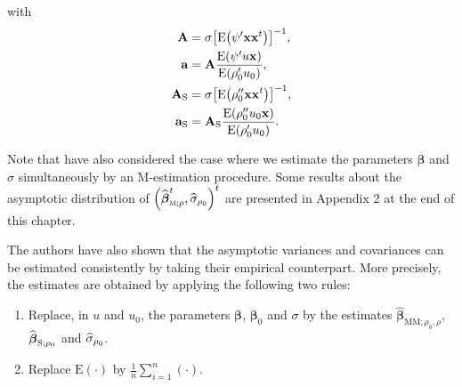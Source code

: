 with
\begin{align}
\mathbf{A}  &  =\sigma\left[  \mathrm{E}\left(  \psi^{\prime}\mathbf{xx}%
^{t}\right)  \right]  ^{-1},\label{eq:A}\\
\mathbf{a}  &  =\mathbf{A}\frac{\mathrm{E}\left(  \psi^{\prime}u\stvec{x}%
\right)  }{\mathrm{E}\left(  \rho_{0}^{\prime}u_{0}\right)  },\label{eq:a}\\
\mathbf{A}_{\mathrm{S}}  &  =\sigma\left[  \mathrm{E}\left(  \rho_{0}%
^{\prime\prime}\mathbf{xx}^{t}\right)  \right]  ^{-1},\label{eq:A_S}\\
\mathbf{a}_{\mathrm{S}}  &  =\mathbf{A}_{\mathrm{S}}\frac{\mathrm{E}\left(
\rho_{0}^{\prime\prime}u_{0}\stvec{x}\right)  }{\mathrm{E}\left(  \rho
_{0}^{\prime}u_{0}\right)  }. \label{eq:a_S}%
\end{align}


\begin{stremark}
\bigskip Note that \citet{Croux:2003} have also considered the case where we
estimate the parameters $\boldsymbol\beta$ and $\sigma$ simultaneously by an
M-estimation procedure. Some results about the asymptotic distribution of
$\left(  \sthat{\boldsymbol\beta}_{\stsc{M};\rho}^{t},\sthat{\sigma
}_{\rho_{0}}\right)  ^{t}$ are presented in Appendix 2 at the end of this chapter.
\end{stremark}

The authors have also shown that the asymptotic variances and covariances can
be estimated consistently by taking their empirical counterpart. More
precisely, the estimates are obtained by applying the following two rules:

\begin{enumerate}
\item Replace, in $u$ and $u_{0}$, the parameters $\boldsymbol\beta$,
$\boldsymbol\beta_{0}$ and $\sigma$ by the estimates $\widehat
{\boldsymbol\beta}_{\mathrm{MM};\rho_{0},\rho}$, $\widehat{\boldsymbol{\beta
}}_{\mathrm{S};\rho_{0}}$ and $\widehat{\sigma}_{\rho_{0}}$.

\item Replace $\mathrm{E}\left(  \cdot\right)  $ by $\frac{1}{n}\sum_{i=1}%
^{n}\left(  \cdot\right)  $.
\end{enumerate}

